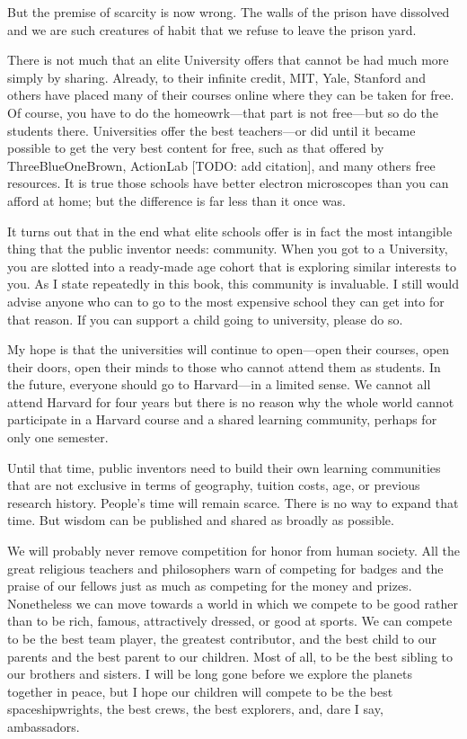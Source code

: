 \documentclass[
	fontsize=10pt, %
	twoside=false, %
	secnumdepth=1, %
]{kaobook}
\begin{document}
But the premise of scarcity is now wrong. The walls of the prison have
dissolved and we are such creatures of habit that we refuse to leave the prison yard.

There is not much that an elite University offers that cannot be had much
more simply by sharing.
Already, to their infinite credit, MIT, Yale, Stanford and others have placed many
of their courses online where they can be taken for free. Of course, you have to do
the homeowrk---that part is not free---but so do the students there.
Universities offer the best teachers---or did until it became possible to get the
very best content for free, such as that offered by ThreeBlueOneBrown, ActionLab [TODO: add citation],
and many others free resources.
It is true those schools have better electron microscopes than you can afford at home;
but the difference is far less than it once was.

It turns out that in the end what elite schools offer is in fact the most
intangible thing that the public inventor needs: community.
When you got to a University, you are slotted into a ready-made age cohort
that is exploring similar interests to you.
As I state repeatedly in this book, this community is invaluable.
I still would advise anyone who can to go to the most expensive school they
can get into for that reason.
If you can support a child going to university, please do so.

My hope is that the universities will continue to open---open their courses,
open their doors, open their minds to those who cannot attend them as students.
In the future, everyone should go to Harvard---in a limited sense.
We cannot all attend Harvard for four years but there is no reason why the
whole world cannot participate in a Harvard course and a shared learning community,
perhaps for only one semester.

Until that time, public inventors need to build their own learning communities that
are not exclusive in terms of geography, tuition costs, age, or previous research history.
People's time will remain scarce. There is no way to expand that time. But wisdom
can be published and shared as broadly as possible.

We will probably never remove competition for honor
from human society. All the great religious
teachers and philosophers warn of competing for badges and the
praise of our fellows just as much as competing for the
money and prizes.
Nonetheless we can move towards a world in which we compete
to be good rather than to be rich, famous,
attractively dressed, or good at sports.
We can compete to be the best team player,
the greatest contributor, and
the best child to our parents and the best parent to
our children.
Most of all, to be the best sibling to our brothers and sisters.
I will be long gone before we explore the planets together in
peace, but I hope our children will compete to be the best
spaceshipwrights, the best crews, the best explorers,
and, dare I say, ambassadors.
\end{document}
